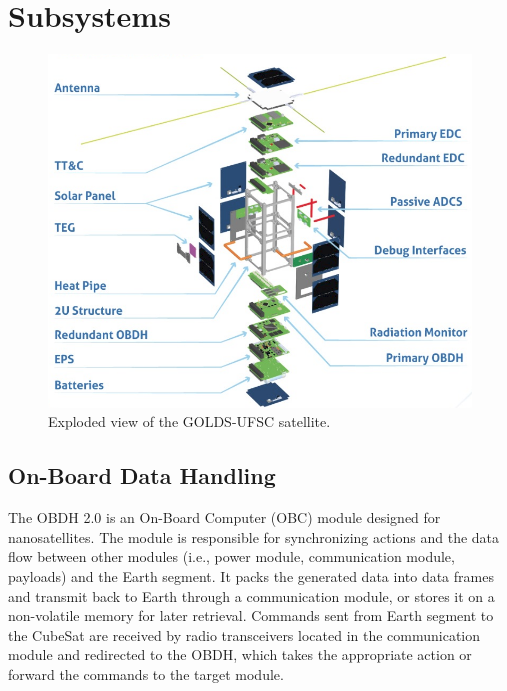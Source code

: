 %
%
%
%
%

%
%
%
%
%
%

\chapter{Subsystems} \label{ch:subsystems}

\begin{figure}[!ht]
    \begin{center}
        \includegraphics[width=\textwidth]{figures/exploded-view}
        \caption{Exploded view of the GOLDS-UFSC satellite.}
        \label{fig:exploded-view}
    \end{center}
\end{figure}

\section{On-Board Data Handling}

The OBDH 2.0 is an On-Board Computer (OBC) module designed for nanosatellites. The module is responsible for synchronizing actions and the data flow between other modules (i.e., power module, communication module, payloads) and the Earth segment. It packs the generated data into data frames and transmit back to Earth through a communication module, or stores it on a non-volatile memory for later retrieval. Commands sent from Earth segment to the CubeSat are received by radio transceivers located in the communication module and redirected to the OBDH, which takes the appropriate action or forward the commands to the target module.

